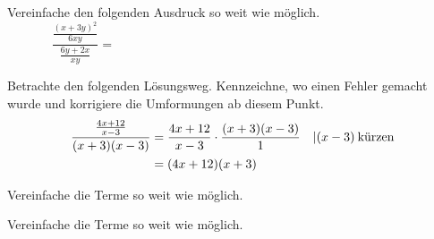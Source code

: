 \documentclass[11pt]{exam}
\begin{document}
\begin{questions}
\question[4]
Vereinfache den folgenden Ausdruck so weit wie möglich.
\[\frac{\frac{(x+3y)^2}{6xy}}{\frac{6y+2x}{xy}}=\hspace{10cm}\] %

\question[4]
Betrachte den folgenden Lösungsweg. Kennzeichne, wo einen Fehler gemacht wurde und korrigiere die Umformungen ab diesem Punkt.
\begin{align*}
	\frac{\frac{4x+12}{x-3}}{(x+3)(x-3)}&=\frac{4x+12}{x-3}\cdot\frac{(x+3)(x-3)}{1} &&\vert (x-3)\:\text{kürzen}\\
	&=(4x+12)(x+3)
\end{align*}




\question[6]
Vereinfache die Terme so weit wie möglich.

\question[6] %
Vereinfache die Terme so weit wie möglich.





\end{questions}
\end{document}

